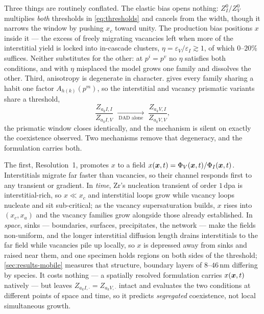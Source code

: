 Three things are routinely conflated. The elastic bias opens nothing:
$Z^{0}_{I}/Z^{0}_{V}$ multiplies \emph{both} thresholds in \cref{eq:thresholds}
and cancels from the width, though it narrows the window by pushing $x_c$ toward
unity. The production bias positions $x$ inside it --- the excess of freely
migrating vacancies left when more of the interstitial yield is locked into
in-cascade clusters, $\eta=\varepsilon_V/\varepsilon_I\gtrsim1$, of which
$0$--$20\%$ suffices. Neither substitutes for the other: at $p^{i}=p^{v}$ no $\eta$
satisfies both conditions, and with $\eta$ misplaced the model grows one family
and dissolves the other. Third, anisotropy is degenerate in character.
 gives every family sharing a habit one factor $A_{h(k)}(p^{m})$,
so the interstitial and vacancy prismatic variants share a threshold,
\begin{equation}
  \frac{Z_{a_k I,I}}{Z_{a_k I,V}}
  \;\xrightarrow[\ \text{DAD alone}\ ]{}\;
  \frac{Z_{a_k V,I}}{Z_{a_k V,V}} ,
  \label{eq:dad-degenerate}
\end{equation}
the prismatic window closes identically, and the mechanism is silent on exactly
the coexistence observed. Two mechanisms remove that degeneracy, and the
formulation carries both.

The first, Resolution~1, promotes $x$ to a field
$x(\bm{x},t)=\Phi_V(\bm{x},t)/\Phi_I(\bm{x},t)$. Interstitials migrate far faster than
vacancies, so their channel responds first to any transient or gradient. In
\emph{time}, Zr's nucleation transient of order $1\,$dpa is interstitial-rich,
so $x\ll x_c$ and interstitial loops grow while vacancy loops nucleate and sit
sub-critical; as the vacancy supersaturation builds, $x$ rises into $(x_c,x_a)$
and the vacancy families grow alongside those already established. In
\emph{space}, sinks --- boundaries, surfaces, precipitates, the network --- make
the fields non-uniform, and the longer interstitial diffusion length drains
interstitials to the far field while vacancies pile up locally, so $x$ is
depressed away from sinks and raised near them, and one specimen holds regions
on both sides of the threshold; \cref{sec:results-mobile} measures that
structure, boundary layers of $8$--$46\,$nm differing by species. It costs
nothing --- a spatially resolved formulation carries $x(\bm{x},t)$ natively --- but
leaves $Z_{a_kI,\cdot}=Z_{a_kV,\cdot}$ intact and evaluates the two conditions
at different points of space and time, so it predicts \emph{segregated}
coexistence, not local simultaneous growth.

